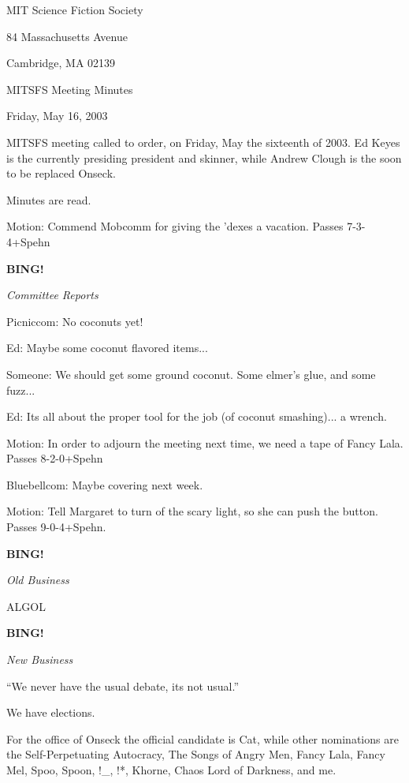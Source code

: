 \documentclass[12pt]{article}
\newcommand{\bing}{{\bf BING!} }
\newcommand{\goto}[1]{\bing \vskip 12pt \centerline{{\em{#1}}}}
\begin{document}
\begin{center}

MIT Science Fiction Society 

84 Massachusetts Avenue

Cambridge, MA 02139

\vspace{12pt}

MITSFS Meeting Minutes 

Friday, May 16, 2003

\end{center}
 
\vspace{18pt}

\setlength{\parskip}{6pt}

\noindent

MITSFS meeting called to order, on Friday, May the sixteenth of 2003.  Ed Keyes is the currently presiding president and skinner, while Andrew Clough is the soon to be replaced Onseck.

Minutes are read.

Motion:  Commend Mobcomm for giving the 'dexes a vacation.  Passes 7-3-4+Spehn

\goto{Committee Reports}

Picniccom:  No coconuts yet!

Ed:  Maybe some coconut flavored items...

Someone:  We should get some ground coconut.  Some elmer's glue, and some fuzz...

Ed:   Its all about the proper tool for the job (of coconut smashing)... a wrench.

Motion:  In order to adjourn the meeting next time, we need a tape of Fancy Lala.  Passes 8-2-0+Spehn

Bluebellcom:  Maybe covering next week.

Motion:  Tell Margaret to turn of the scary light, so she can push the button.  Passes 9-0-4+Spehn.


\goto{Old Business}

ALGOL

\goto{New Business}

``We never have the usual debate, its not usual.''

We have elections.

For the office of Onseck the official candidate is Cat, while other nominations are the Self-Perpetuating Autocracy, The Songs of Angry Men, Fancy Lala, Fancy Mel, Spoo, Spoon, !\_, !*, Khorne, Chaos Lord of Darkness, and me.
\end{document}
